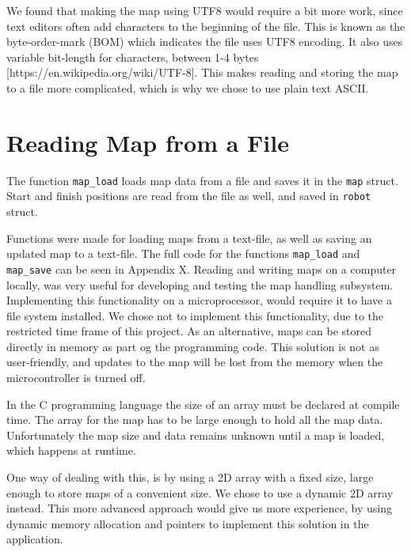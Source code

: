 We found that making the map using UTF8 would require a bit more work, since text editors often add characters to the beginning of the file. 
This is known as the byte-order-mark (BOM) which indicates the file uses UTF8 encoding. 
It also uses variable bit-length for characters, between 1-4 bytes [https://en.wikipedia.org/wiki/UTF-8].
This makes reading and storing the map to a file more complicated, which is why we chose to use plain text ASCII.

\newpage
\section{Reading Map from a File}
\label{sec:map_read} %
The function {\tt map\_load} loads map data from a file and saves it in the {\tt map} struct.
Start and finish positions are read from the file as well, and saved in {\tt robot} struct.

Functions were made for loading maps from a text-file, as well as saving an updated map to a text-file. 
The full code for the functions {\tt map\_load} and {\tt map\_save} can be seen in Appendix X.
Reading and writing maps on a computer locally, was very useful for developing and testing the map handling subsystem. 
Implementing this functionality on a microprocessor, would require it to have a file system installed.
We chose not to implement this functionality, due to the restricted time frame of this project.
As an alternative, maps can be stored directly in memory as part og the programming code. 
This solution is not as user-friendly, and updates to the map will be lost from the memory when the microcontroller is turned off.

In the C programming language the size of an array must be declared at compile time. 
The array for the map has to be large enough to hold all the map data.
Unfortunately the map size and data remains unknown until a map is loaded, which happens at runtime.

One way of dealing with this, is by using a 2D array with a fixed size, large enough to store maps of a convenient size. 
We chose to use a dynamic 2D array instead. This more advanced approach would give us more experience, by using dynamic memory allocation and pointers to implement this solution in the application.

